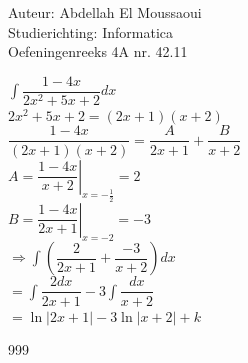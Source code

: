 \documentclass[a4paper]{article}
\begin{document}
  
\noindent \large Auteur: Abdellah El Moussaoui \\
\noindent \large Studierichting: Informatica\\
\noindent \large Oefeningenreeks 4A nr. 42.11\\

\medskip

\normalsize

$\displaystyle\int \dfrac{1-4x}{2x^2+5x+2}dx$\\

$2x^2+5x+2 = \left(2x+1\right)\left(x+2\right)$\\

$\dfrac{1-4x}{\left(2x+1\right)\left(x+2\right)} = \dfrac{A}{2x+1} + \dfrac{B}{x+2}$\\

$A = \left. \dfrac{1-4x}{x+2}\right|_{x=-\tfrac{1}{2}}=2$\\

$B = \left. \dfrac{1-4x}{2x+1}\right|_{x=-2}=-3$\\

$\Rightarrow \displaystyle\int \left(\dfrac{2}{2x+1} + \dfrac{-3}{x+2}\right)dx$\\

$= \displaystyle\int \dfrac{2dx}{2x+1} -3\displaystyle\int\dfrac{dx}{x+2}$\\

$= \ln{\left|2x+1\right|}-3\ln{\left|x+2\right|}+k$\\


\begin{thebibliography}{999}
\end{thebibliography}
\end{document}
